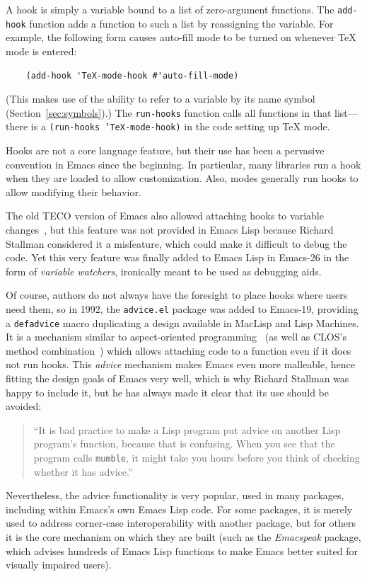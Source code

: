\documentclass[format=acmsmall, review]{acmart}
\newcommand \Elisp {Emacs Lisp}
\begin{document}
A hook is simply a variable bound to a list of zero-argument
functions.  The \texttt{add-hook} function adds a function to such a
list by reassigning the variable.  For example, the following form
causes auto-fill mode to be turned on whenever \TeX{} mode is entered:
%
\begin{verbatim}
    (add-hook 'TeX-mode-hook #'auto-fill-mode)
\end{verbatim}

(This makes use of the ability to refer to a variable by its name
symbol (Section~\ref{sec:symbols}).)  The \texttt{run-hooks} function calls all functions in that
list---there is a \texttt{(run-hooks 'TeX-mode-hook)} in the code
setting up \TeX{} mode.

Hooks are not a core language feature, but their use has been a
pervasive convention in Emacs since the beginning.  In particular, many
libraries run a hook when they are loaded to allow customization.
Also, modes generally run hooks to allow modifying their behavior.

The old TECO version of Emacs also allowed attaching hooks to variable
changes~\cite{Stallman1981}, but this feature was not provided in \Elisp{}
because Richard Stallman considered it a misfeature, which could make it
difficult to debug the code.  Yet this very feature was finally added to
\Elisp{} in Emacs-26 in the form of \emph{variable watchers},
ironically meant to be used as debugging aids.

Of course, authors do not always have the foresight to place hooks where
users need them, so in 1992, the \texttt{advice.el} package was added to
Emacs-19, providing a \texttt{defadvice} macro duplicating a design
available in MacLisp and Lisp Machines.  It is a mechanism similar to
aspect-oriented programming~\cite{Kiczales97} (as well as CLOS's method
combination~\cite{DeMichielGabriel1987}) which allows attaching code to
a function even if it does not run hooks.
This \emph{advice} mechanism
makes Emacs even more malleable, hence fitting the design goals of
Emacs very well, which is why Richard Stallman was happy to include it, but
he has always made it clear that its use should be avoided:
\begin{quotation}
  ``It is bad practice to make a Lisp
  program put advice on another Lisp program's function, because that is
  confusing.  When you see that the program calls \texttt{mumble}, it might
  take you hours before you think of checking whether it has
  advice.''~\cite{Stallman2018-personal}
\end{quotation}
Nevertheless, the advice functionality is very popular, used in many
packages, including within Emacs's own \Elisp{} code.  For some packages, it is
merely used to address corner-case interoperability with another package,
but for others it is the core mechanism on which they are built (such as
the \emph{Emacspeak} package, which advises hundreds of \Elisp{} functions to
make Emacs better suited for visually impaired users).
\end{document}
